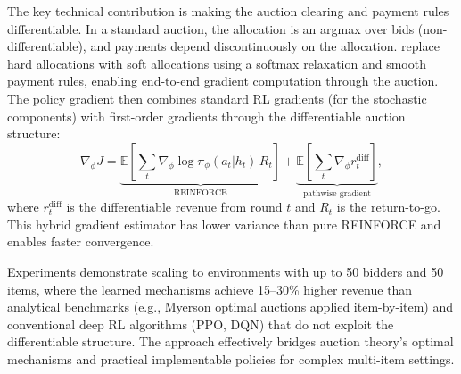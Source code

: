 The key technical contribution is making the auction clearing and payment rules differentiable. In a standard auction, the allocation is an argmax over bids (non-differentiable), and payments depend discontinuously on the allocation. \citet{RavindranathEtAl2024} replace hard allocations with soft allocations using a softmax relaxation and smooth payment rules, enabling end-to-end gradient computation through the auction. The policy gradient then combines standard RL gradients (for the stochastic components) with first-order gradients through the differentiable auction structure:
\begin{equation}
\nabla_\phi J = \underbrace{\mathbb{E}\left[\sum_t \nabla_\phi \log \pi_\phi(a_t | h_t) \, R_t\right]}_{\text{REINFORCE}} + \underbrace{\mathbb{E}\left[\sum_t \nabla_\phi r_t^{\text{diff}}\right]}_{\text{pathwise gradient}}, \label{eq:rav_gradient}
\end{equation}
where $r_t^{\text{diff}}$ is the differentiable revenue from round $t$ and $R_t$ is the return-to-go. This hybrid gradient estimator has lower variance than pure REINFORCE and enables faster convergence.

Experiments demonstrate scaling to environments with up to 50 bidders and 50 items, where the learned mechanisms achieve 15--30\% higher revenue than analytical benchmarks (e.g., Myerson optimal auctions applied item-by-item) and conventional deep RL algorithms (PPO, DQN) that do not exploit the differentiable structure. The approach effectively bridges auction theory's optimal mechanisms and practical implementable policies for complex multi-item settings.
